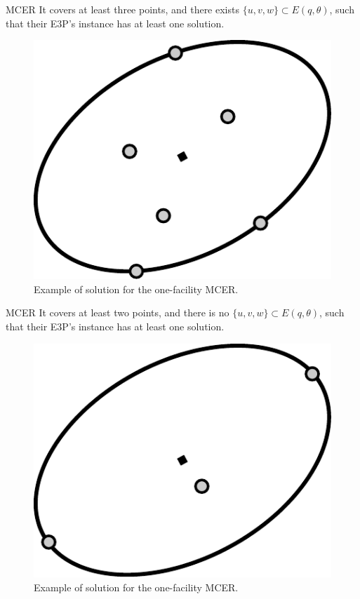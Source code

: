 \documentclass{beamer}
\theoremstyle{definition}
\begin{document}
\begin{frame}{MCER}
	It covers at least three points, and there exists $\{u,v,w\}\subset E(q,\theta)$, such that their E3P's instance has at least one solution.
	\begin{figure}
		\centering
		\includegraphics[scale=.6]{figures/mcer2}
		\caption{Example of solution for the one-facility MCER.}
	\end{figure}
\end{frame}

\begin{frame}{MCER}
	It covers at least two points, and there is no $\{u,v,w\}\subset E(q,\theta)$, such that their E3P's instance has at least one solution.
	\begin{figure}
		\centering
		\includegraphics[scale=.6]{figures/mcer1}
		\caption{Example of solution for the one-facility MCER.}
	\end{figure}
\end{frame}
\end{document}
